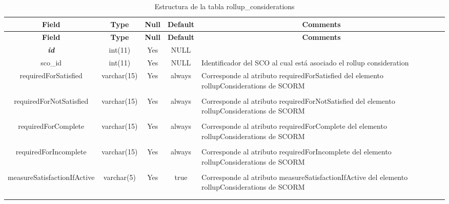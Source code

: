 %
%
\begin{longtable}{c c c c l}
	\multicolumn{1}{c}{\textbf{Field}} &
	\multicolumn{1}{c}{\textbf{Type}} &
	\multicolumn{1}{c}{\textbf{Null}} &
	\multicolumn{1}{c}{\textbf{Default}} &
	\multicolumn{1}{c}{\textbf{Comments}} \\ \hline \hline
\endfirsthead
	\multicolumn{1}{c}{\textbf{Field}} &
	\multicolumn{1}{c}{\textbf{Type}} &
	\multicolumn{1}{c}{\textbf{Null}} &
	\multicolumn{1}{c}{\textbf{Default}} &
	\multicolumn{1}{c}{\textbf{Comments}} \\ \hline \hline
\endhead \endfoot
	\textbf{\textit{id}} & int(11) & Yes & NULL \\ \hline 
	sco\_id & int(11) & Yes & NULL & \parbox[t]{0.35\textwidth}{Identificador del SCO al cual está asociado el rollup consideration}\\ \hline 
	requiredForSatisfied & varchar(15) & Yes & always & \parbox[t]{0.35\textwidth}{Corresponde al atributo requiredForSatisfied del elemento rollupConsiderations de SCORM } \\ \\  \hline
	requiredForNotSatisfied & varchar(15) & Yes & always & \parbox[t]{0.35\textwidth}{Corresponde al atributo requiredForNotSatisfied del elemento rollupConsiderations de SCORM} \\ \\  \hline
	requiredForComplete & varchar(15) & Yes & always & \parbox[t]{0.35\textwidth}{Corresponde al atributo requiredForComplete del elemento rollupConsiderations de SCORM} \\ \\  \hline
	requiredForIncomplete & varchar(15) & Yes & always & \parbox[t]{0.35\textwidth}{Corresponde al atributo requiredForIncomplete del elemento rollupConsiderations de SCORM} \\ \\  \hline
	measureSatisfactionIfActive & varchar(5) & Yes & true & \parbox[t]{0.35\textwidth}{Corresponde al atributo measureSatisfactionIfActive del elemento rollupConsiderations de SCORM} \\ \\  \hline
 \caption{Estructura de la tabla rollup\_considerations} \label{tab:scorm_rollup_considerations-structure} \\
\end{longtable}

